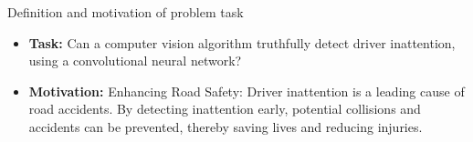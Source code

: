 

\maketitle
\begin{frame}{\huge{Definition and motivation of problem task}}
  \begin{itemize}
    \item \textbf{Task:} Can a computer vision algorithm truthfully detect driver inattention, using a convolutional neural network? 
    \item \textbf{Motivation:} Enhancing Road Safety: Driver inattention is a leading cause of road accidents. By detecting inattention early, potential collisions and accidents can be prevented, thereby saving lives and reducing injuries.
  \end{itemize}
\end{frame}
% 
